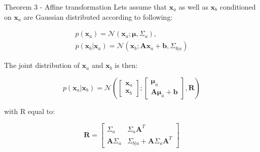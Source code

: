 \begin{definition}{Theorem 3 - Affine transformation}
    Lets assume that $\textbf{x}_a$ as well as $\textbf{x}_b$ conditioned on $\textbf{x}_a$ are Gaussian distributed according to following:

    \begin{equation}
    \begin{aligned}
        p(\bm{x}_a) = \mathcal{N}(\bm{x}_a; \bm{\mu}, \Sigma_a), \\
        p(\bm{x}_b|\bm{x}_a) = \mathcal{N}(\bm{x}_b; \textbf{A}\bm{x}_a + \textbf{b}, \Sigma_{b|a})
    \end{aligned}
    \end{equation}

    The joint distribution of $\textbf{x}_a$ and $\textbf{x}_b$ is then:

    \begin{equation}
        p(\bm{x}_a|\bm{x}_b) = \mathcal{N} \left( \begin{bmatrix} \bm{x}_a \\ \bm{x}_b \end{bmatrix} ; \begin{bmatrix} \bm{\mu}_a \\ \textbf{A}\bm{\mu}_a + \textbf{b} \end{bmatrix}, \textbf{R} \right)
    \end{equation}

    with R equal to:

    \begin{equation}
        \textbf{R} = \begin{bmatrix} \Sigma_a & \Sigma_a \textbf{A}^{T} \\ \textbf{A}\Sigma_a & \Sigma_{b|a} + \textbf{A}\Sigma_a \textbf{A}^{T}  \end{bmatrix}
    \end{equation}

\end{definition}


 
% 
% 
